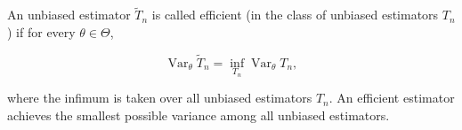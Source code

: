 An unbiased estimator $\tilde{T}_n$ is called efficient (in the class of unbiased estimators $T_n$) if for every $\theta \in \Theta$,

$$\operatorname{Var}_\theta \tilde{T}_n = \inf_{T_n} \operatorname{Var}_\theta T_n,$$

where the infimum is taken over all unbiased estimators $T_n$. An efficient estimator achieves the smallest possible variance among all unbiased estimators.
